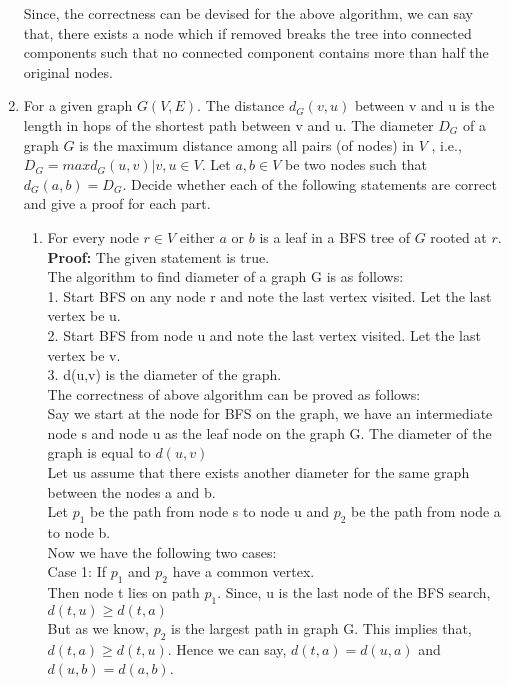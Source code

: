 \documentclass[12pt]{article}
\begin{document}
\begin{enumerate}
Since, the correctness can be devised for the above algorithm, we can say that, there exists a node which if removed breaks the tree into connected components such that no connected component contains more than half the original nodes. 
\pagebreak
\item For a given graph $G(V, E)$. The distance $d_G(v, u)$ between v and u is the length in hops of the shortest path between v and u. The diameter $D_G$ of a graph $G$ is the maximum distance among all pairs (of nodes) in $V$ , i.e., $D_G = max{d_G(u, v) | v, u \in V }$. Let $a,b \in V$ be two nodes such that $d_G(a,b) = D_G$. Decide whether each of the following statements are correct and give a proof for each part.

\begin{enumerate}
\item For every node $r\in V$ either $a$ or $b$ is a leaf in a BFS tree of $G$ rooted at $r$.	\\
\textbf{Proof:} The given statement is true. \\
The algorithm to find diameter of a graph G is as follows:\\
1. Start BFS on any node r and note the last vertex visited. Let the last vertex be u.\\
2. Start BFS from node u and note the last vertex visited. Let the last vertex be v.\\
3. d(u,v) is the diameter of the graph.\\
The correctness of above algorithm can be proved as follows:\\
Say we start at the node for BFS on the graph, we have an intermediate node s and node 
u as the leaf node on the graph G. The diameter of the graph is equal to $d(u,v)$\\
Let us assume that there exists another diameter for the same graph between the nodes a and b.\\
Let $p_1$ be the path from node s to node u and $p_2$ be the path from node a to node b.\\
Now we have the following two cases: \\
Case 1: If $p_1$ and $p_2$ have a common vertex.\\
Then node t lies on path $p_1$. Since, u is the last node of the BFS search, $d(t,u) \ge d(t,a)$\\
But as we know, $p_2$ is the largest path in graph G. This implies that, $d(t,a) \ge d(t,u)$. Hence we can say, $d(t,a) = d(u,a)$
and $d(u,b) = d(a,b)$.\\

\end{enumerate}
\end{enumerate}
\end{document}
